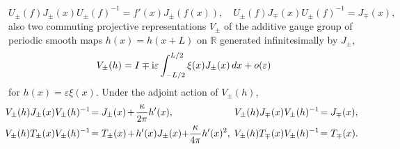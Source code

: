 \documentclass[12pt,a4paper]{article}
\newcommand{\ii}{{\rm i}}
\theoremstyle{definition}
\theoremstyle{remark}
\begin{document}
%
\begin{equation}
U_{\pm}(f)J_{\pm}(x)U_{\pm}(f)^{-1} = f'(x)J_{\pm}(f(x)),
\quad
U_{\pm}(f)J_{\mp}(x)U_{\pm}(f)^{-1} = J_{\mp}(x),
\end{equation}
%
also two commuting projective representations $V_{\pm}$ of the additive gauge group of periodic smooth maps $h(x)=h(x+L)$ on $\mathbb R$ generated infinitesimally by $J_{\pm}$,
%
\begin{equation}
V_{\pm}(h)
= I \mp \ii\varepsilon\int_{-L/2}^{L/2}\xi(x)J_{\pm}(x) \, dx + o(\varepsilon)
\end{equation}
%
for $h(x) = \varepsilon\xi(x)$.
Under the adjoint action of $V_\pm(h)$,
%
\begin{align}
\hspace{-0.15cm}
V_{\pm}(h)J_{\pm}(x)V_{\pm}(h)^{-1}
& \! = J_{\pm}(x)\hspace{-0.04cm}+\hspace{-0.04cm}
  \frac{\kappa}{2\pi}h'(x),
& \hspace{-0.2cm} V_{\pm}(h)J_{\mp}(x)V_{\pm}(h)^{-1}
& \! = J_{\mp}(x), \\
\hspace{-0.15cm}
V_{\pm}(h)T_{\pm}(x)V_{\pm}(h)^{-1}
& \! = T_{\pm}(x)\hspace{-0.04cm} +\hspace{-0.04cm} h'(x)J_{\pm}(x)\hspace{-0.08cm} +\hspace{-0.08cm} \frac{\kappa}{4\pi}h'(x)^2,
& \hspace{-0.2cm} V_{\pm}(h)T_{\mp}(x)V_{\pm}(h)^{-1}
& \! = T_{\mp}(x).
\end{align}
%
\end{document}
